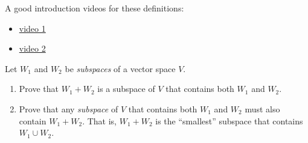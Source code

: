\begin{note}
A good introduction videos for these definitions:
\begin{itemize}
    \item \href{https://youtu.be/Rcj1-E3SAhs?t=901}{video 1}
    \item \href{https://www.youtube.com/watch?v=qs240Jhl6Rs}{video 2}
\end{itemize}
\end{note}

\begin{exercise} \label{exercise 1.3.23}
Let \(W_1\) and \(W_2\) be \emph{subspaces} of a vector space \(V\).
\begin{enumerate}
    \item Prove that \(W_1 + W_2\) is a subspace of \(V\) that contains both \(W_1\) and \(W_2\).
    \item Prove that any \emph{subspace} of \(V\) that contains both \(W_1\) and \(W_2\) must also contain \(W_1 + W_2\). That is, \(W_1 + W_2\) is the ``smallest'' subspace that contains \(W_1 \cup W_2\).
\end{enumerate}
\end{exercise}


